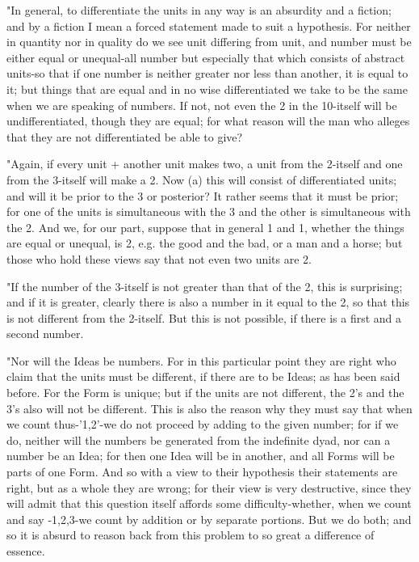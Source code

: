 "In general, to differentiate the units in any way is an absurdity
and a fiction; and by a fiction I mean a forced statement made to
suit a hypothesis. For neither in quantity nor in quality do we see
unit differing from unit, and number must be either equal or unequal-all
number but especially that which consists of abstract units-so that
if one number is neither greater nor less than another, it is equal
to it; but things that are equal and in no wise differentiated we
take to be the same when we are speaking of numbers. If not, not even
the 2 in the 10-itself will be undifferentiated, though they are equal;
for what reason will the man who alleges that they are not differentiated
be able to give? 

"Again, if every unit + another unit makes two, a unit from the 2-itself
and one from the 3-itself will make a 2. Now (a) this will consist
of differentiated units; and will it be prior to the 3 or posterior?
It rather seems that it must be prior; for one of the units is simultaneous
with the 3 and the other is simultaneous with the 2. And we, for our
part, suppose that in general 1 and 1, whether the things are equal
or unequal, is 2, e.g. the good and the bad, or a man and a horse;
but those who hold these views say that not even two units are 2.

"If the number of the 3-itself is not greater than that of the 2,
this is surprising; and if it is greater, clearly there is also a
number in it equal to the 2, so that this is not different from the
2-itself. But this is not possible, if there is a first and a second
number. 

"Nor will the Ideas be numbers. For in this particular point they
are right who claim that the units must be different, if there are
to be Ideas; as has been said before. For the Form is unique; but
if the units are not different, the 2's and the 3's also will not
be different. This is also the reason why they must say that when
we count thus-'1,2'-we do not proceed by adding to the given number;
for if we do, neither will the numbers be generated from the indefinite
dyad, nor can a number be an Idea; for then one Idea will be in another,
and all Forms will be parts of one Form. And so with a view to their
hypothesis their statements are right, but as a whole they are wrong;
for their view is very destructive, since they will admit that this
question itself affords some difficulty-whether, when we count and
say -1,2,3-we count by addition or by separate portions. But we do
both; and so it is absurd to reason back from this problem to so great
a difference of essence. 

